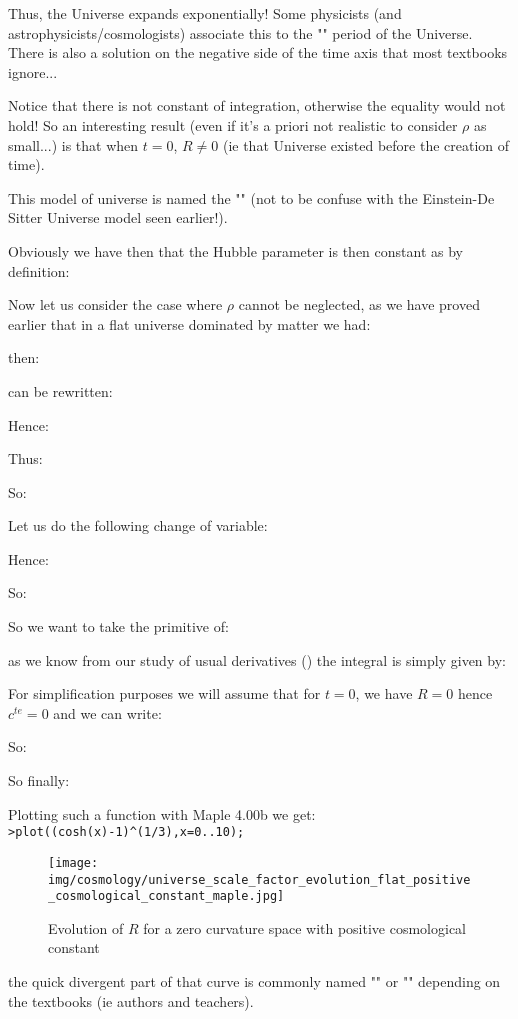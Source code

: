 \begin{itemize}
\begin{itemize}
				Thus, the Universe expands exponentially! Some physicists (and astrophysicists/cosmologists) associate this to the "" period of the Universe. There is also a solution on the negative side of the time axis that most textbooks ignore...
				\begin{tcolorbox}[title=Remark,colframe=black,arc=10pt]
				Notice that there is not constant of integration, otherwise the equality would not hold! So an interesting result (even if it's a priori not realistic to consider $\rho$ as small...) is that when $t=0$, $R\neq 0$ (ie that Universe existed before the creation of time).
				\end{tcolorbox}
				This model of universe is named the "" (not to be confuse with the Einstein-De Sitter Universe model seen earlier!).
				
				Obviously we have then that the Hubble parameter is then constant as by definition:
				
				
				Now let us consider the case where $\rho$ cannot be neglected, as we have proved earlier that in a flat universe dominated by matter we had:
				
				then:
				
				can be rewritten:
				
				Hence:
				
				Thus:
				
				
				So:
				
				Let us do the following change of variable:
				
				Hence:
				
				So:
				
				So we want to take the primitive of:
				
				as we know from our study of usual derivatives () the integral is simply given by:
				
				For simplification purposes we will assume that for $t=0$, we have $R=0$ hence $c^{te}=0$ and we can write:
				
				So:
				
				So finally:
				
				Plotting such a function with Maple 4.00b we get:\\
				
				\texttt{>plot((cosh(x)-1)\string^(1/3),x=0..10);}
				
				\begin{figure}[H]
					\centering
					\texttt{[image: img/cosmology/universe\_scale\_factor\_evolution\_flat\_positive\_cosmological\_constant\_maple.jpg]}
					\caption[]{Evolution of $R$ for a zero curvature space with positive cosmological constant}
				\end{figure}
				the quick divergent part of that curve is commonly named "" or "" depending on the textbooks (ie authors and teachers).
				

\end{itemize}
\end{itemize}
